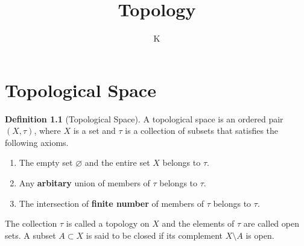 \documentclass[a4paper]{book}
\title{Topology}
\author{K}
\theoremstyle{definition}
\newtheorem{definition}{Definition}[chapter]
\begin{document}
\maketitle
\tableofcontents
\chapter{Topological Space}
\begin{defbox}
    \begin{definition}[Topological Space]
        A {\color{maththen}topological space} is an {\color{mathobj}ordered pair} \((X, \tau)\), where \(X\) is a {\color{mathif}set} and \(\tau\) is a {\color{mathif}collection of subsets} that satisfies the following {\color{mathrem}axioms}.
        \begin{enumerate}
            \item The {\color{mathif}empty set} \(\varnothing\) and the {\color{mathif}entire set} \(X\) belongs to \(\tau\).
            \item Any \textbf{arbitary} {\color{mathif}union} of members of \(\tau\) belongs to \(\tau\).
            \item The {\color{mathif}intersection} of \textbf{finite number} of members of \(\tau\) belongs to \(\tau\).
        \end{enumerate}
        The {\color{mathobj}collection} \(\tau\) is called a {\color{maththen}topology} on \(X\) and the {\color{mathobj}elements} of \(\tau\) are called {\color{maththen}open sets}. A {\color{mathobj}subset} \(A \subset X\) is said to be {\color{maththen}closed} if its {\color{mathif}complement} \(X \setminus A\) is {\color{mathif}open}.
    \end{definition}
\end{defbox}
\end{document}
